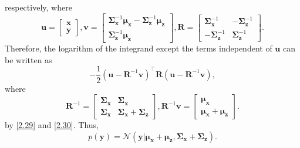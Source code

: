 %
respectively, where
%
\[
\mathbf{u}
= 
\begin{bmatrix}
\mathbf{x} 
\\
\mathbf{y}
\end{bmatrix}
,
\mathbf{v}
= 
\begin{bmatrix}
\bm{\Sigma}_{\mathbf{x}} ^ {- 1}
\bm{\mu}_{\mathbf{x}}
-
\bm{\Sigma}_{\mathbf{z}} ^ {- 1}
\bm{\mu}_{\mathbf{z}} 
\\
\bm{\Sigma}_{\mathbf{z}} ^ {- 1}
\bm{\mu}_{\mathbf{z}}
\end{bmatrix}
,
\mathbf{R}
= 
\begin{bmatrix}
\bm{\Sigma}_{\mathbf{x}} ^ {- 1} 
& 
- 
\bm{\Sigma}_{\mathbf{z}} ^ {- 1} 
\\
- 
\bm{\Sigma}_{\mathbf{z}} ^ {- 1} 
& 
\bm{\Sigma}_{\mathbf{z}} ^ {- 1}
\end{bmatrix}
.
\]
%
Therefore, the logarithm of the integrand except the terms independent of $\mathbf{u}$ can be written as
%
\begin{equation}
-
\frac{1}{2}
\left( 
	\mathbf{u}
	- 
	\mathbf{R} ^ {- 1}
	\mathbf{v}
\right) ^ \intercal
\mathbf{R}
\left( 
	\mathbf{u}
	- 
	\mathbf{R} ^ {- 1}
	\mathbf{v}
\right),
\end{equation}
%
where
%
\[
\mathbf{R} ^ {- 1}
=
\begin{bmatrix}
\bm{\Sigma}_\mathbf{x} 
& 
\bm{\Sigma}_\mathbf{x} 
\\
\bm{\Sigma}_\mathbf{x} 
& 
\bm{\Sigma}_\mathbf{x} 
+ 
\bm{\Sigma}_\mathbf{z}
\end{bmatrix}
,
\mathbf{R} ^ {- 1}
\mathbf{v}
=
\begin{bmatrix}
\bm{\mu}_\mathbf{x} 
\\
\bm{\mu}_\mathbf{x} 
+ 
\bm{\mu}_\mathbf{z}
\end{bmatrix}
.
\]
%
by \ref{2.29} and \ref{2.30}.
Thus,
%
\begin{equation}
p(\mathbf{y})
= 
\mathcal{N} 
\left(
	\mathbf{y} 
	| 
	\bm{\mu}_\mathbf{x} 
	+ 
	\bm{\mu}_\mathbf{z},
	\bm{\Sigma}_\mathbf{x} 
	+ 
	\bm{\Sigma}_\mathbf{z}
\right).
\end{equation}
%



